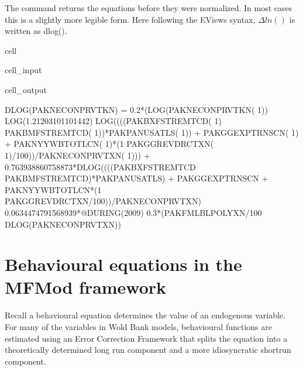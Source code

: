 \documentclass[letterpaper,10pt,english]{jupyterBook}
\begin{document}
\sphinxAtStartPar
The  command returns the equations before they were normalized. In most cases this is a slightly more legible form. Here following the EViews syntax, \(\Delta ln()\) is written as dlog().

\begin{sphinxuseclass}{cell}\begin{sphinxVerbatimInput}

\begin{sphinxuseclass}{cell_input}
\begin{sphinxVerbatim}[commandchars=\\\{\}]
\end{sphinxVerbatim}

\end{sphinxuseclass}\end{sphinxVerbatimInput}
\begin{sphinxVerbatimOutput}

\begin{sphinxuseclass}{cell_output}
\begin{sphinxVerbatim}[commandchars=\\\{\}]
DLOG(PAKNECONPRVTKN) =\PYGZhy{} 0.2*(LOG(PAKNECONPRVTKN( \PYGZhy{} 1)) \PYGZhy{} LOG(1.21203101101442) \PYGZhy{} LOG((((PAKBXFSTREMTCD( \PYGZhy{} 1) \PYGZhy{} PAKBMFSTREMTCD( \PYGZhy{} 1))*PAKPANUSATLS( \PYGZhy{} 1)) + PAKGGEXPTRNSCN( \PYGZhy{} 1) + PAKNYYWBTOTLCN( \PYGZhy{} 1)*(1 \PYGZhy{} PAKGGREVDRCTXN( \PYGZhy{} 1)/100))/PAKNECONPRVTXN( \PYGZhy{} 1))) + 0.763938860758873*DLOG((((PAKBXFSTREMTCD \PYGZhy{} PAKBMFSTREMTCD)*PAKPANUSATLS) + PAKGGEXPTRNSCN + PAKNYYWBTOTLCN*(1 \PYGZhy{} PAKGGREVDRCTXN/100))/PAKNECONPRVTXN) \PYGZhy{} 0.0634474791568939*@DURING(\PYGZdq{}2009\PYGZdq{}) \PYGZhy{} 0.3*(PAKFMLBLPOLYXN/100 \PYGZhy{} DLOG(PAKNECONPRVTXN))
\end{sphinxVerbatim}

\end{sphinxuseclass}\end{sphinxVerbatimOutput}

\end{sphinxuseclass}

\section{Behavioural equations in the MFMod framework}
\label{\detokenize{content/05_WBModels/LoadingWBModel:behavioural-equations-in-the-mfmod-framework}}
\sphinxAtStartPar
Recall a behavioural equation determines the value of an endogenous variable. For many of the variables in Wold Bank models, behavioural functions are estimated using an Error Correction Framework that splits the equation into a theoretically determined long run component and a more idiosyncratic short\sphinxhyphen{}run component.
\end{document}
